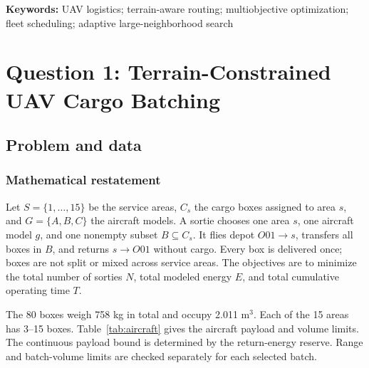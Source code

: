 \documentclass[11pt,a4paper]{article}
\newcommand{\keywords}[1]{\par\noindent\textbf{Keywords:} #1}
\begin{document}
\begin{abstract}
We study terrain-constrained cargo batching and multi-stop fleet scheduling for UAV emergency supply. For the first task, exhaustive feasible-batch generation and subset dynamic programming produce the complete baseline Pareto set; its representative plan uses 18 sorties, while the minimum-energy endpoint uses 19. For the second task, adaptive large-neighborhood search with deadline-directed route enrichment and tabu-guided neighborhood search yields a feasible 24-sortie schedule, compared with 39 sorties for the late-first baseline. The recommendation meets all hard deadlines and resource constraints. An 18-sortie route-cover lower bound applies to the initial candidate pool, but the full scheduling problem is not certified optimal. Energy results depend on the stated flight-energy model.
\end{abstract}
\keywords{UAV logistics; terrain-aware routing; multiobjective optimization; fleet scheduling; adaptive large-neighborhood search}

\section{Question 1: Terrain-Constrained UAV Cargo Batching}
\subsection{Problem and data}
\subsubsection{Mathematical restatement}
Let $S=\{1,\ldots,15\}$ be the service areas, $C_s$ the cargo boxes assigned to area $s$, and $G=\{A,B,C\}$ the aircraft models. A sortie chooses one area $s$, one aircraft model $g$, and one nonempty subset $B\subseteq C_s$. It flies depot $O01\to s$, transfers all boxes in $B$, and returns $s\to O01$ without cargo. Every box is delivered once; boxes are not split or mixed across service areas. The objectives are to minimize the total number of sorties $N$, total modeled energy $E$, and total cumulative operating time $T$.

The 80 boxes weigh 758 kg in total and occupy 2.011 m$^3$. Each of the 15 areas has 3--15 boxes. Table~\ref{tab:aircraft} gives the aircraft payload and volume limits. The continuous payload bound is determined by the return-energy reserve. Range and batch-volume limits are checked separately for each selected batch.
\end{document}
